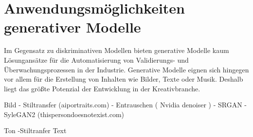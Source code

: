 \section{Anwendungsmöglichkeiten generativer Modelle}\label{Anwendungsmöglichkeiten generativer Modelle}

Im Gegensatz zu diskriminativen Modellen bieten generative Modelle kaum Lösungansätze für die Automatisierung von Validierungs- und Überwachungsprozessen in der Industrie. Generative Modelle eignen sich hingegen vor allem für die Erstellung von Inhalten wie Bilder, Texte oder Musik.
Deshalb liegt das größte Potenzial der Entwicklung in der Kreativbranche.

Bild
- Stiltransfer (aiportraits.com)
- Entrauschen ( Nvidia denoiser )
- SRGAN
- SyleGAN2 (thispersondoesnotexist.com)

Ton
-Stiltranfer
Text